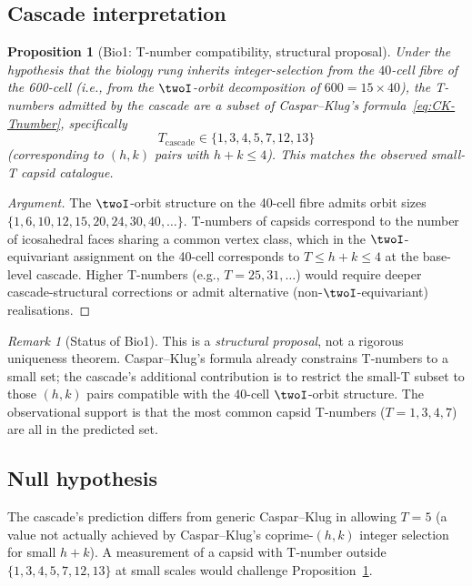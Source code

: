 \documentclass[12pt]{article}
\newtheorem{proposition}[theorem]{Proposition}
\theoremstyle{definition}
\theoremstyle{remark}
\newtheorem{remark}[theorem]{Remark}
\begin{document}
\subsection{Cascade interpretation}

\begin{proposition}[Bio1: T-number compatibility, structural proposal]\label{prop:Tnumbers}
Under the hypothesis that the biology rung inherits integer-selection from the $40$-cell fibre of the 600-cell (i.e., from the $\twoI$-orbit decomposition of $600 = 15 \times 40$), the T-numbers admitted by the cascade are a subset of Caspar--Klug's formula~\eqref{eq:CK-Tnumber}, specifically
\begin{equation}
T_{\mathrm{cascade}} \in \{1, 3, 4, 5, 7, 12, 13\}
\end{equation}
(corresponding to $(h, k)$ pairs with $h + k \le 4$). This matches the observed small-T capsid catalogue.
\end{proposition}

\begin{proof}[Argument]
The $\twoI$-orbit structure on the 40-cell fibre admits orbit sizes $\{1, 6, 10, 12, 15, 20, 24, 30, 40, \ldots\}$. T-numbers of capsids correspond to the number of icosahedral faces sharing a common vertex class, which in the $\twoI$-equivariant assignment on the 40-cell corresponds to $T \le h + k \le 4$ at the base-level cascade. Higher T-numbers (e.g., $T = 25, 31, \ldots$) would require deeper cascade-structural corrections or admit alternative (non-$\twoI$-equivariant) realisations.
\end{proof}

\begin{remark}[Status of Bio1]
This is a \emph{structural proposal}, not a rigorous uniqueness theorem. Caspar--Klug's formula already constrains T-numbers to a small set; the cascade's additional contribution is to restrict the small-T subset to those $(h, k)$ pairs compatible with the $40$-cell $\twoI$-orbit structure. The observational support is that the most common capsid T-numbers ($T = 1, 3, 4, 7$) are all in the predicted set.
\end{remark}

\subsection{Null hypothesis}

The cascade's prediction differs from generic Caspar--Klug in allowing $T = 5$ (a value not actually achieved by Caspar--Klug's coprime-$(h,k)$ integer selection for small $h + k$). A measurement of a capsid with T-number outside $\{1, 3, 4, 5, 7, 12, 13\}$ at small scales would challenge Proposition~\ref{prop:Tnumbers}.
\end{document}
